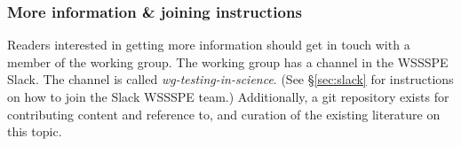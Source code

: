\subsubsection{More information \& joining instructions}

Readers interested in getting more information should get in touch
with a member of the working group. The working group
has a channel in the WSSSPE Slack. The channel is called
{\it wg-testing-in-science}.
(See \S\ref{sec:slack} for instructions on how to join the Slack WSSSPE team.)
Additionally, a git
repository  exists for contributing content and reference to, and
curation of the existing literature on this topic.